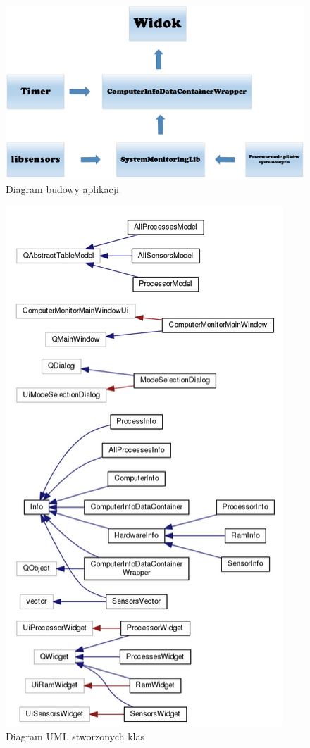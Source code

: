 \documentclass[a4paper]{article}
\begin{document}
\begin{figure}[h]
	\centering
	\includegraphics[width=\linewidth]{img/diagramBudowyAplikacji.png}
	\caption{Diagram budowy aplikacji}
	\label{diagram_budowy_aplikacji}
\end{figure}


\begin{figure}[h]
	\centering
	\includegraphics[height=0.75\paperheight]{img/diagramKlas.png}
	\caption{Diagram UML stworzonych klas}
	\label{diagram_klas}
\end{figure}
\end{document}
